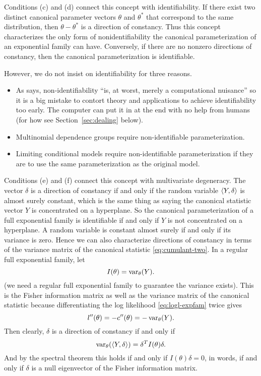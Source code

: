 Conditions (c) and (d) connect this concept with identifiability.
If there exist two distinct canonical parameter vectors $\theta$ and $\theta^*$
that correspond to the same distribution, then $\theta - \theta^*$ is a
direction of constancy.  Thus this concept characterizes the only form
of nonidentifiability the canonical parameterization of an exponential
family can have.  Conversely, if there are no nonzero directions of constancy,
then the canonical parameterization is identifiable.

However, we do not insist on identifiability for three reasons.
\begin{itemize}
\item
As \citet{geyer-gdor} says, non-identifiability ``is, at worst, merely
a computational nuisance'' so it is a big mistake to contort theory
and applications to achieve identifiability too early.  The computer
can put it in at the end with no help from humans
(for how see Section~\ref{sec:dealing} below).
\item Multinomial dependence groups require non-identifiable parameterization.
\item Limiting conditional models require non-identifiable parameterization
if they are to use the same parameterization as the original model.
\end{itemize}

Conditions (e) and (f) connect this concept with multivariate degeneracy.
The vector $\delta$ is a direction of constancy if and only if the random
variable $\langle Y, \delta \rangle$ is almost surely constant, which is the
same thing as saying the canonical statistic vector $Y$ is concentrated
on a hyperplane.  So the canonical parameterization of a full exponential
family is identifiable if and only if $Y$ is not concentrated on a hyperplane.
A random variable is constant almost surely if and only if its variance
is zero.  Hence we can also characterize directions of constancy in
terms of the variance matrix of the canonical statistic
\eqref{eq:cumulant-two}.  In a regular full exponential family, let
$$
   I(\theta) = \operatorname{var}_\theta(Y).
$$
(we need a regular full exponential family to guarantee the variance exists).
This is the Fisher information matrix as well as the variance matrix
of the canonical statistic because differentiating the log likelihood
\eqref{eq:logl-expfam} twice gives
$$
   l''(\theta) = - c''(\theta) = - \operatorname{var}_\theta(Y).
$$
Then clearly, $\delta$ is a direction of constancy if and only if
$$
   \operatorname{var}_\theta(\langle Y, \delta \rangle) = \delta^T I(\theta) \delta.
$$
And by the spectral theorem
\citet[Section~79]{halmos-vector-spaces} this holds if and only if
$I(\theta) \delta = 0$, in words, if and only if $\delta$ is a null
eigenvector of the Fisher information matrix.

